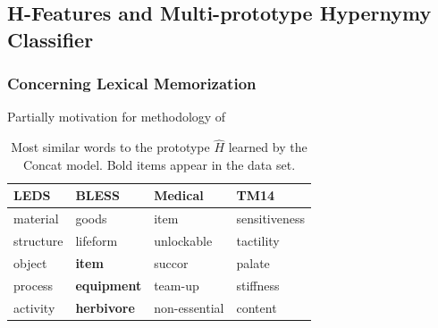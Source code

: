 \documentclass[letterpaper]{article}
\begin{document}
\subsection{H-Features and Multi-prototype Hypernymy Classifier \cite{roller:2016:emnlp}}
\label{sec:multiprototype}


\subsubsection{Concerning Lexical Memorization}
\label{sec:lexmem}

Partially motivation for methodology of 

\begin{table}
\begin{center}
  \begin{small}
  \begin{tabular}{|llll|}
    \hline
    LEDS & BLESS & Medical & TM14\\
    \hline
     material       &      goods             &     item           &      sensitiveness          \\
     structure      &      lifeform          &     unlockable     &      tactility              \\
     object         & {\bf item}             &     succor         &      palate                 \\
     process        & {\bf equipment}        &     team-up        &      stiffness              \\
     activity       & {\bf herbivore}        &     non-essential  &      content                \\
    \hline
  \end{tabular}
  \end{small}
\end{center}
\caption{Most similar words to the prototype $\hat H$ learned by the Concat model. Bold items
appear in the data set.}
\label{tab:wordsim}
\end{table}
\end{document}

